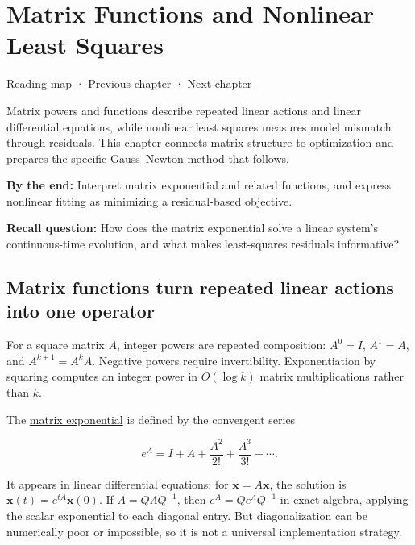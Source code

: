 \hypertarget{02-foundations-ii-ch026}{}
\chapter{Matrix Functions and Nonlinear Least Squares}\label{02-foundations-ii-ch026-matrix-functions-and-nonlinear-least-squares}

\hyperref[volume-reading-map]{Reading map} · \hyperref[02-foundations-ii-ch025-continuous-models-and-numerical-error]{Previous chapter} · \hyperref[02-foundations-ii-ch027-gaussnewton-for-geometry-and-pose]{Next chapter}

Matrix powers and functions describe repeated linear actions and linear differential equations, while nonlinear least squares measures model mismatch through residuals. This chapter connects matrix structure to optimization and prepares the specific Gauss--Newton method that follows.

\textbf{By the end:} Interpret matrix exponential and related functions, and express nonlinear fitting as minimizing a residual-based objective.

\textbf{Recall question:} How does the matrix exponential solve a linear system's continuous-time evolution, and what makes least-squares residuals informative?

\section{Matrix functions turn repeated linear actions into one operator}\label{02-foundations-ii-ch026-matrix-functions-turn-repeated-linear-actions-into-one-operator}

For a square matrix \(A\), integer powers are repeated composition: \(A^0=I\), \(A^1=A\), and \(A^{k+1}=A^kA\). Negative powers require invertibility. Exponentiation by squaring computes an integer power in \(O(\log k)\) matrix multiplications rather than \(k\).

The \hyperref[02-foundations-ii-ch026-matrix-functions-turn-repeated-linear-actions-into-one-operator]{matrix exponential} is defined by the convergent series

\[
e^A=I+A+\frac{A^2}{2!}+\frac{A^3}{3!}+\cdots.
\]

It appears in linear differential equations: for \(\dot{\mathbf x}=A\mathbf x\), the solution is \(\mathbf x(t)=e^{tA}\mathbf x(0)\). If \(A=Q\Lambda Q^{-1}\), then \(e^A=Qe^\Lambda Q^{-1}\) in exact algebra, applying the scalar exponential to each diagonal entry. But diagonalization can be numerically poor or impossible, so it is not a universal implementation strategy.

